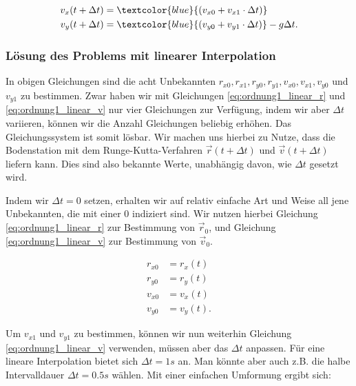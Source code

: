 \begin{equation}\label{eq:ordnung1_linear_v}
\begin{aligned}
v_x(t + \Delta t) &= \textcolor{blue}{(v_{x0} + v_{x1}  \cdot \Delta t)} \\
v_y(t+ \Delta t) &= \textcolor{blue}{(v_{y0} + v_{y1} \cdot \Delta t)} - g \Delta t.
\end{aligned}
\end{equation}

\subsubsection{Lösung des Problems mit linearer Interpolation}
\label{section:perturbation_ordnung1_linear}

In obigen Gleichungen sind die acht Unbekannten $r_{x0}, r_{x1}, r_{y0}, r_{y1}, v_{x0}, v_{x1}, v_{y0}$ und $v_{y1}$ zu bestimmen.
Zwar haben wir mit Gleichungen \eqref{eq:ordnung1_linear_r} und \eqref{eq:ordnung1_linear_v} nur vier Gleichungen zur Verfügung,
indem wir aber $\Delta t$ variieren, können wir die Anzahl Gleichungen beliebig erhöhen.
Das Gleichungssystem ist somit lösbar.
Wir machen uns hierbei zu Nutze, dass die Bodenstation mit dem Runge-Kutta-Verfahren $\vec{r}(t + \Delta t)$ und $\vec{v}(t + \Delta t)$ liefern kann.
Dies sind also bekannte Werte, unabhängig davon, wie $\Delta t$ gesetzt wird.

Indem wir $\Delta t = 0$ setzen, erhalten wir auf relativ einfache Art und Weise all jene Unbekannten, die mit einer $0$ indiziert sind.
Wir nutzen hierbei Gleichung \eqref{eq:ordnung1_linear_r} zur Bestimmung von $\vec{r}_0$, und Gleichung \eqref{eq:ordnung1_linear_v} zur Bestimmung von $\vec{v}_0$.

\begin{equation}
\label{eq:ordnung1_linear_solutionPart1}
\begin{aligned}
r_{x0} &= r_x(t) \\
r_{y0} &= r_y(t) \\
v_{x0} &= v_x(t) \\
v_{y0} &= v_y(t).
\end{aligned}
\end{equation}

Um $v_{x1}$ und $v_{y1}$ zu bestimmen, können wir nun weiterhin Gleichung \eqref{eq:ordnung1_linear_v} verwenden, müssen aber das $\Delta t$ anpassen.
Für eine lineare Interpolation bietet sich $\Delta t = 1s$ an.
Man könnte aber auch z.B. die halbe Intervalldauer $\Delta t = 0.5s$ wählen.
Mit einer einfachen Umformung ergibt sich:

